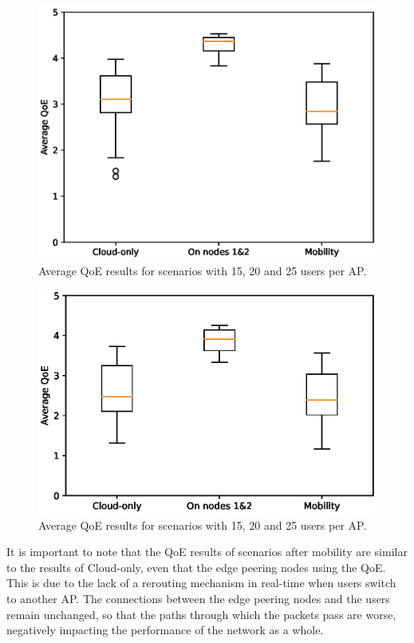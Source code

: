 \begin{figure}[!h]
    \centering
    \includegraphics[width=\linewidth]{images/QoEBoxplot-20u.eps}
    \vspace{-0.9cm}
    \caption{Average QoE results for scenarios with 15, 20 and 25 users per AP.}
    \label{fig:exp-setup-scenario}
\end{figure}

\begin{figure}[!h]
    \centering
    \includegraphics[width=\linewidth]{images/QoEBoxplot-25u.eps}
    \vspace{-0.9cm}
    \caption{Average QoE results for scenarios with 15, 20 and 25 users per AP.}
    \label{fig:exp-setup-scenario}
\end{figure}


It is important to note that the QoE results of scenarios after mobility are similar to the results of Cloud-only, even that the edge peering nodes using the QoE. This is due to the lack of a rerouting mechanism in real-time when users switch to another AP. The connections between the edge peering nodes and the users remain unchanged, so that the paths through which the packets pass are worse, negatively impacting the performance of the network as a whole.

